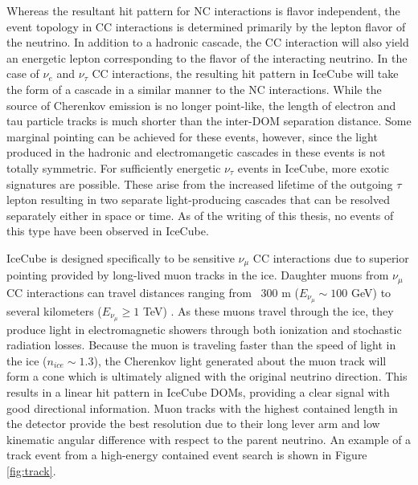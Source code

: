 \documentclass{gatech-thesis}
\begin{document}
Whereas the resultant hit pattern for NC interactions is flavor independent, the event topology in CC interactions is determined primarily by the lepton flavor of the neutrino. In addition to a hadronic cascade, the CC interaction will also yield an energetic lepton corresponding to the flavor of the interacting neutrino. In the case of $\nu_{e}$ and $\nu_{\tau}$ CC interactions, the resulting hit pattern in IceCube will take the form of a cascade in a similar manner to the NC interactions. While the source of Cherenkov emission is no longer point-like, the length of electron and tau particle tracks is much shorter than the inter-DOM separation distance. Some marginal pointing can be achieved for these events, however, since the light produced in the hadronic and electromangetic cascades in these events is not totally symmetric. For sufficiently energetic $\nu_{\tau}$ events in IceCube, more exotic signatures are possible. These arise from the increased lifetime of the outgoing $\tau$ lepton resulting in two separate light-producing cascades that can be resolved separately either in space or time. As of the writing of this thesis, no events of this type have been observed in IceCube.

IceCube is designed specifically to be sensitive $\nu_{\mu}$ CC interactions due to superior pointing provided by long-lived muon tracks in the ice. Daughter muons from $\nu_{\mu}$ CC interactions can travel distances ranging from ~300 m ($E_{\nu_{\mu}}\sim 100$ GeV) to several kilometers ($E_{\nu_{\mu}}\geq 1$ TeV) \cite{2001PhRvD..63i4020I}. As these muons travel through the ice, they produce light in electromagnetic showers through both ionization and stochastic radiation losses. Because the muon is traveling faster than the speed of light in the ice ($n_{ice} \sim 1.3$), the Cherenkov light generated about the muon track will form a cone which is ultimately aligned with the original neutrino direction. This results in a linear hit pattern in IceCube DOMs, providing a clear signal with good directional information. Muon tracks with the highest contained length in the detector provide the best resolution due to their long lever arm and low kinematic angular difference with respect to the parent neutrino. An example of a track event from a high-energy contained event search is shown in Figure \ref{fig:track}.
\end{document}
